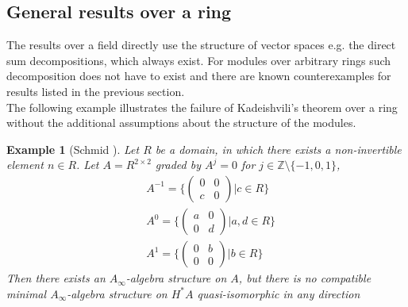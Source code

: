\documentclass[a4paper, 12pt, openany, fleqn]{amsart}
\newtheorem{exmp}[theorem]{Example}
\begin{document}
\subsection{General results over a ring}
 The results over a field directly use the structure of vector spaces e.g. the direct sum decompositions, which always exist. For modules over arbitrary rings such decomposition does not have to exist and there are known counterexamples for results listed in the previous section.\\
The following example illustrates the failure of Kadeishvili's theorem over a ring without the additional assumptions about the structure of the modules.
\begin{exmp}[Schmid \cite{A-infty_rings}]
    Let $R$ be a domain, in which there exists a non-invertible element $n\in R$. Let $A=R^{2\times 2}$ graded by $A^j = 0$ for $j\in \mathbb{Z}\setminus \{-1,0,1\}$,
    \begin{align*}
        &A^{-1} = \Biggl\{ \begin{pmatrix}
                        0 & 0 \\
                        c & 0
                    \end{pmatrix} \Bigg\vert c\in R\Biggr\}\\
        &A^{0} = \Biggl\{ \begin{pmatrix}
                        a & 0 \\
                        0 & d
                    \end{pmatrix} \Bigg\vert a,d\in R\Biggr\}\\
        &A^{1} = \Biggl\{ \begin{pmatrix}
                        0 & b \\
                        0 & 0
                    \end{pmatrix} \Bigg\vert b\in R\Biggr\}
    \end{align*}
    Then there exists an $A_\infty$-algebra structure on $A$, but there is no compatible minimal $A_\infty$-algebra structure on $H^*A$ quasi-isomorphic in any direction
\end{exmp}
\end{document}
